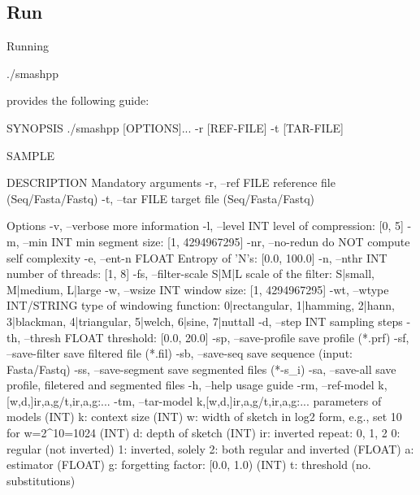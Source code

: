 \subsection{Run}
Running
\begin{code}[style=bash]
./smashpp
\end{code}
provides the following guide:
\begin{code}[style=bash]
SYNOPSIS
  ./smashpp [OPTIONS]...  -r [REF-FILE] -t [TAR-FILE]

SAMPLE

DESCRIPTION
  Mandatory arguments
  -r,  --ref FILE            reference file (Seq/Fasta/Fastq)
  -t,  --tar FILE            target file    (Seq/Fasta/Fastq)
  
  Options
  -v,  --verbose             more information
  -l,  --level INT           level of compression: [0, 5]
  -m,  --min   INT           min segment size: [1, 4294967295]
  -nr, --no-redun            do NOT compute self complexity
  -e,  --ent-n FLOAT         Entropy of 'N's: [0.0, 100.0]
  -n,  --nthr  INT           number of threads: [1, 8]
  -fs, --filter-scale S|M|L  scale of the filter:
                             {S|small, M|medium, L|large}
  -w,  --wsize INT           window size: [1, 4294967295]
  -wt, --wtype INT/STRING    type of windowing function:
                             {0|rectangular, 1|hamming, 2|hann,
                             3|blackman, 4|triangular, 5|welch,
                             6|sine, 7|nuttall}
  -d,  --step   INT          sampling steps
  -th, --thresh FLOAT        threshold: [0.0, 20.0]
  -sp, --save-profile        save profile (*.prf)
  -sf, --save-filter         save filtered file (*.fil)
  -sb, --save-seq            save sequence (input: Fasta/Fastq)
  -ss, --save-segment        save segmented files (*-s_i)
  -sa, --save-all            save profile, filetered and
                             segmented files
  -h,  --help                usage guide
  -rm, --ref-model  k,[w,d,]ir,a,g/t,ir,a,g:...
  -tm, --tar-model  k,[w,d,]ir,a,g/t,ir,a,g:...
                             parameters of models
                       (INT) k:  context size
                       (INT) w:  width of sketch in log2 form,
                                 e.g., set 10 for w=2^10=1024
                       (INT) d:  depth of sketch
                       (INT) ir: inverted repeat: {0, 1, 2}
                                 0: regular (not inverted)
                                 1: inverted, solely
                                 2: both regular and inverted
                     (FLOAT) a:  estimator
                     (FLOAT) g:  forgetting factor: [0.0, 1.0)
                       (INT) t:  threshold (no. substitutions)
\end{code}

